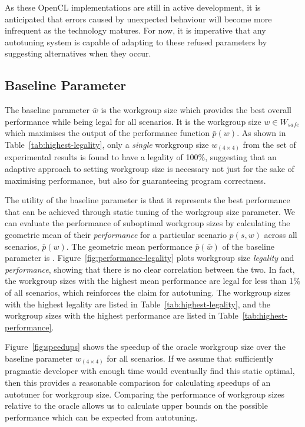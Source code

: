 As these OpenCL implementations are still in active development, it is
anticipated that errors caused by unexpected behaviour will become
more infrequent as the technology matures. For now, it is imperative
that any autotuning system is capable of adapting to these refused
parameters by suggesting alternatives when they occur.



\subsection{Baseline Parameter}\label{subsec:baseline}

The baseline parameter $\bar{w}$ is the workgroup size which provides
the best overall performance while being legal for all scenarios. It
is the workgroup size $w \in W_{safe}$ which maximises the output of
the performance function $\bar{p}(w)$. As shown in
Table~\ref{tab:highest-legality}, only a \emph{single} workgroup size
$w_{(4 \times 4)}$ from the set of experimental results is found to
have a legality of 100\%, suggesting that an adaptive approach to
setting workgroup size is necessary not just for the sake of
maximising performance, but also for guaranteeing program correctness.

The utility of the baseline parameter is that it represents the best
performance that can be achieved through static tuning of the
workgroup size parameter. We can evaluate the performance of
suboptimal workgroup sizes by calculating the geometric mean of their
\emph{performance} for a particular scenario $p(s, w)$ across all
scenarios, $\bar{p}(w)$. The geometric mean performance
$\bar{p}(\bar{w})$ of the baseline parameter is
. Figure~\ref{fig:performance-legality} plots
workgroup size \emph{legality} and \emph{performance}, showing that
there is no clear correlation between the two. In fact, the workgroup
sizes with the highest mean performance are legal for less than 1\% of
all scenarios, which reinforces the claim for autotuning. The
workgroup sizes with the highest legality are listed in
Table~\ref{tab:highest-legality}, and the workgroup sizes with the
highest performance are listed in Table~\ref{tab:highest-performance}.

Figure~\ref{fig:speedups} shows the speedup of the oracle workgroup
size over the baseline parameter $w_{(4 \times 4)}$ for all
scenarios. If we assume that sufficiently pragmatic developer with
enough time would eventually find this static optimal, then this
provides a reasonable comparison for calculating speedups of an
autotuner for workgroup size. Comparing the performance of workgroup
sizes relative to the oracle allows us to calculate upper bounds on
the possible performance which can be expected from autotuning.


